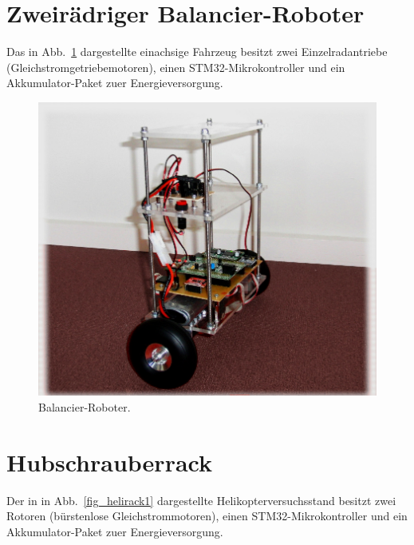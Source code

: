 \documentclass[a4paper,10pt]{scrartcl}
\newcommand{\figref}[1]{Abb.~\ref{#1}}
\begin{document}
    
\newpage

\section{Zweirädriger Balancier-Roboter}    
Das in \figref{fig_robo1} dargestellte einachsige Fahrzeug  besitzt zwei Einzelradantriebe (Gleichstromgetriebemotoren), einen STM32-Mikrokontroller und ein Akkumulator-Paket zuer Energieversorgung.


\begin{figure}[h]
    \begin{center}
    \includegraphics[width=.5\textwidth]{img/robo2_klein.jpg}
    \end{center}
    \caption{Balancier-Roboter.}
    \label{fig_robo1}
\end{figure}

\newpage
\section{Hubschrauberrack}
Der in in \figref{fig_helirack1} dargestellte Helikopterversuchsstand besitzt zwei Rotoren (bürstenlose Gleichstrommotoren), einen STM32-Mikrokontroller und ein Akkumulator-Paket zuer Energieversorgung.
\end{document}
